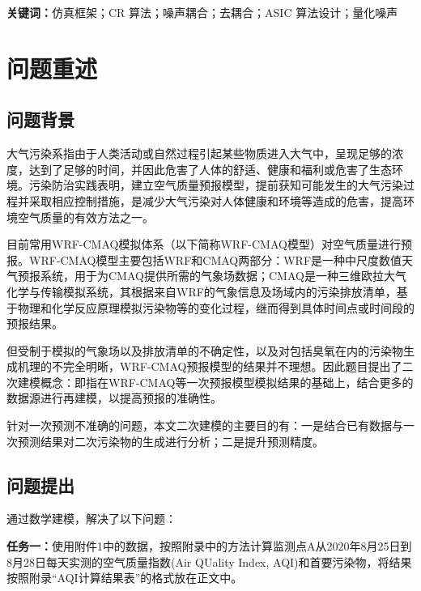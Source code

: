 \documentclass[a4paper,10pt]{my_paper}
\numberwithin{equation}{section}
\begin{document}
\vspace{1em}
\noindent \textbf{关键词：}仿真框架；CR 算法；噪声耦合；去耦合；ASIC 算法设计；量化噪声



\newpage

\begin{center}
\tableofcontents
\end{center}

\newpage
\section{问题重述}
\subsection{问题背景}

大气污染系指由于人类活动或自然过程引起某些物质进入大气中，呈现足够的浓度，达到了足够的时间，并因此危害了人体的舒适、健康和福利或危害了生态环境\cite{ref1}。污染防治实践表明，建立空气质量预报模型，提前获知可能发生的大气污染过程并采取相应控制措施，是减少大气污染对人体健康和环境等造成的危害，提高环境空气质量的有效方法之一。

目前常用WRF-CMAQ模拟体系（以下简称WRF-CMAQ模型）对空气质量进行预报。WRF-CMAQ模型主要包括WRF和CMAQ两部分：WRF是一种中尺度数值天气预报系统，用于为CMAQ提供所需的气象场数据；CMAQ是一种三维欧拉大气化学与传输模拟系统，其根据来自WRF的气象信息及场域内的污染排放清单，基于物理和化学反应原理模拟污染物等的变化过程，继而得到具体时间点或时间段的预报结果。

但受制于模拟的气象场以及排放清单的不确定性，以及对包括臭氧在内的污染物生成机理的不完全明晰，WRF-CMAQ预报模型的结果并不理想。因此题目提出了二次建模概念：即指在WRF-CMAQ等一次预报模型模拟结果的基础上，结合更多的数据源进行再建模，以提高预报的准确性。

针对一次预测不准确的问题，本文二次建模的主要目的有：一是结合已有数据与一次预测结果对二次污染物的生成进行分析；二是提升预测精度。

\subsection{问题提出}
通过数学建模，解决了以下问题：

\textbf{任务一：}使用附件1中的数据，按照附录中的方法计算监测点A从2020年8月25日到8月28日每天实测的空气质量指数(Air QUality Index, AQI)和首要污染物，将结果按照附录“AQI计算结果表”的格式放在正文中。
\end{document}
